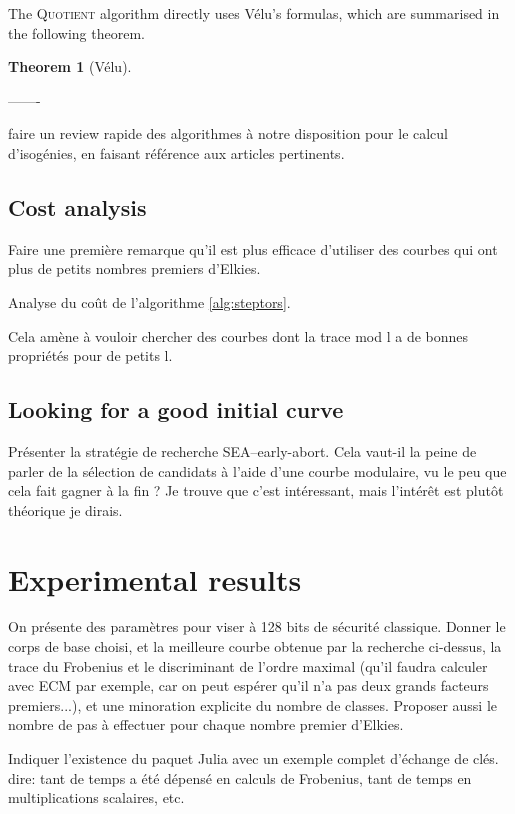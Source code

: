 \documentclass{article}
\newcommand{\algnamestyle}[1]{\textsc{#1}}
\newtheorem{theorem}{Theorem}[section]
\theoremstyle{definition}
\begin{document}
The \algnamestyle{Quotient} algorithm directly uses Vélu's formulas, which are
summarised in the following theorem.
\begin{theorem}[Vélu]

\end{theorem}

-------

faire un review rapide des
algorithmes à notre disposition pour le calcul d'isogénies, en faisant
référence aux articles pertinents.

\subsection{Cost analysis}

Faire une première remarque qu'il est plus efficace d'utiliser des
courbes qui ont plus de petits nombres premiers d'Elkies.

Analyse du coût de l'algorithme \ref{alg:steptors}.

Cela amène à vouloir chercher des courbes dont la trace mod l a de
bonnes propriétés pour de petits l.


\subsection{Looking for a good initial curve}

Présenter la stratégie de
recherche SEA--early-abort. Cela vaut-il la peine de parler de la
sélection de candidats à l'aide d'une courbe modulaire, vu le peu que
cela fait gagner à la fin ? Je trouve que c'est intéressant, mais
l'intérêt est plutôt théorique je dirais.

\section{Experimental results}

On présente des paramètres pour viser à 128 bits de sécurité
classique.  Donner le corps de base choisi, et la meilleure courbe
obtenue par la recherche ci-dessus, la trace du Frobenius et le
discriminant de l'ordre maximal (qu'il faudra calculer avec ECM par
exemple, car on peut espérer qu'il n'a pas deux grands facteurs
premiers...), et une minoration explicite du nombre de classes.
Proposer aussi le nombre de pas à effectuer pour chaque nombre premier
d'Elkies.

Indiquer l'existence du paquet Julia avec un exemple complet d'échange
de clés. dire: tant de temps a été dépensé en
calculs de Frobenius, tant de temps en multiplications scalaires, etc.
\end{document}

